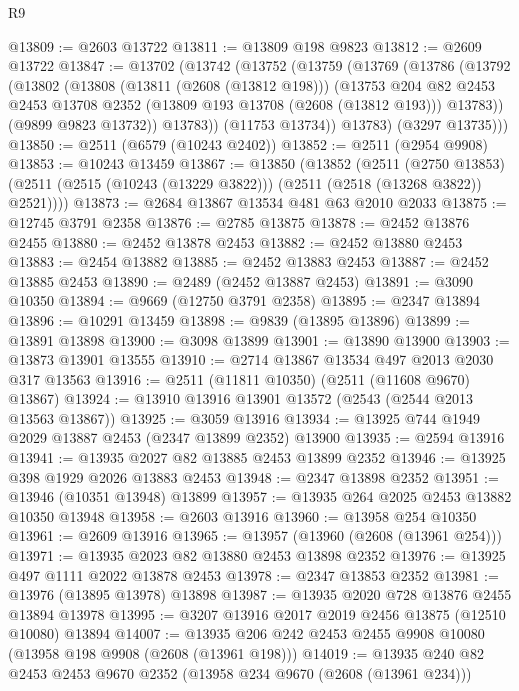 \begin{lexlean}{R9}
\begin{coremodule}
@13809 := @2603 @13722
@13811 := @13809 @198 @9823
@13812 := @2609 @13722
@13847 := @13702
    (@13742
      (@13752
        (@13759
          (@13769
            (@13786
              (@13792
                (@13802
                  (@13808
                    (@13811 (@2608 (@13812 @198)))
                    (@13753
                      @204
                      @82
                      @2453
                      @2453
                      @13708
                      @2352
                      (@13809 @193 @13708 (@2608 (@13812 @193)))
                      @13783))
                  (@9899 @9823 @13732))
                @13783))
            (@11753 @13734))
          @13783)
        (@3297 @13735)))
@13850 := @2511 (@6579 (@10243 @2402))
@13852 := @2511 (@2954 @9908)
@13853 := @10243 @13459
@13867 := @13850
    (@13852
      (@2511
        (@2750 @13853)
        (@2511 (@2515 (@10243 (@13229 @3822))) (@2511 (@2518 (@13268 @3822)) @2521))))
@13873 := @2684 @13867 @13534 @481 @63 @2010 @2033
@13875 := @12745 @3791 @2358
@13876 := @2785 @13875
@13878 := @2452 @13876 @2455
@13880 := @2452 @13878 @2453
@13882 := @2452 @13880 @2453
@13883 := @2454 @13882
@13885 := @2452 @13883 @2453
@13887 := @2452 @13885 @2453
@13890 := @2489 (@2452 @13887 @2453)
@13891 := @3090 @10350
@13894 := @9669 (@12750 @3791 @2358)
@13895 := @2347 @13894
@13896 := @10291 @13459
@13898 := @9839 (@13895 @13896)
@13899 := @13891 @13898
@13900 := @3098 @13899
@13901 := @13890 @13900
@13903 := @13873 @13901 @13555
@13910 := @2714 @13867 @13534 @497 @2013 @2030 @317 @13563
@13916 := @2511 (@11811 @10350) (@2511 (@11608 @9670) @13867)
@13924 := @13910 @13916 @13901 @13572 (@2543 (@2544 @2013 @13563 @13867))
@13925 := @3059 @13916
@13934 := @13925 @744 @1949 @2029 @13887 @2453 (@2347 @13899 @2352) @13900
@13935 := @2594 @13916
@13941 := @13935 @2027 @82 @13885 @2453 @13899 @2352
@13946 := @13925 @398 @1929 @2026 @13883 @2453
@13948 := @2347 @13898 @2352
@13951 := @13946 (@10351 @13948) @13899
@13957 := @13935 @264 @2025 @2453 @13882 @10350 @13948
@13958 := @2603 @13916
@13960 := @13958 @254 @10350
@13961 := @2609 @13916
@13965 := @13957 (@13960 (@2608 (@13961 @254)))
@13971 := @13935 @2023 @82 @13880 @2453 @13898 @2352
@13976 := @13925 @497 @1111 @2022 @13878 @2453
@13978 := @2347 @13853 @2352
@13981 := @13976 (@13895 @13978) @13898
@13987 := @13935 @2020 @728 @13876 @2455 @13894 @13978
@13995 := @3207 @13916 @2017 @2019 @2456 @13875 (@12510 @10080) @13894
@14007 := @13935 @206 @242 @2453 @2455 @9908 @10080 (@13958 @198 @9908 (@2608 (@13961 @198)))
@14019 := @13935 @240 @82 @2453 @2453 @9670 @2352 (@13958 @234 @9670 (@2608 (@13961 @234)))

\end{coremodule}
\end{lexlean}
